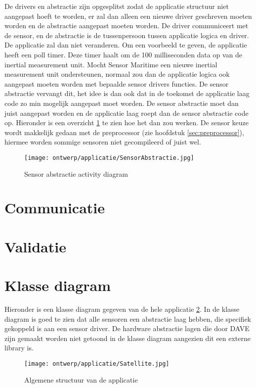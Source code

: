 \noindent De drivers en abstractie zijn opgesplitst zodat de applicatie structuur niet aangepast hoeft te worden, er zal dan alleen een nieuwe driver geschreven moeten worden en de abstractie aangepast moeten worden. De driver communiceert met de sensor, en de abstractie is de tussenpersoon tussen applicatie logica en driver. De applicatie zal dan niet veranderen. Om een voorbeeld te geven, de applicatie heeft een poll timer. Deze timer haalt om de 100 milliseconden data op van de inertial measurement unit. Mocht Sensor Maritime een nieuwe inertial measurement unit ondersteunen, normaal zou dan de applicatie logica ook aangepast moeten worden met bepaalde sensor drivers functies. De sensor abstractie vervangt dit, het idee is dan ook dat in de toekomst de applicatie laag code zo min mogelijk aangepast moet worden. De sensor abstractie moet dan juist aangepast worden en de applicatie laag roept dan de sensor abstractie code op. Hieronder is een overzicht \ref{fig:SensorAbstractie} te zien hoe het dan zou werken. De sensor keuze wordt makkelijk gedaan met de preprocessor (zie hoofdstuk \ref{sec:preprocessor}), hiermee worden sommige sensoren niet gecompileerd of juist wel.
\begin{figure}[h!]
	\centering
	\label{fig:SensorAbstractie}

	\texttt{[image: ontwerp/applicatie/SensorAbstractie.jpg]}
	\caption{Sensor abstractie activity diagram}
\end{figure}
	
	
\newpage
\section{Communicatie}

\newpage

\newpage
\section{Validatie}


\newpage
\section{Klasse diagram}
Hieronder is een klasse diagram gegeven van de hele applicatie \ref{fig:klassediagram}. In de klasse diagram is goed te zien dat alle sensoren een abstractie laag hebben, die specifiek gekoppeld is aan een sensor  driver. De hardware abstractie lagen die door DAVE zijn gemaakt worden niet getoond in de klasse diagram aangezien dit een externe library is.
\begin{figure}[h!]
	\centering
	\label{fig:klassediagram}

	\texttt{[image: ontwerp/applicatie/Satellite.jpg]}
	\caption{Algemene structuur van de applicatie}
\end{figure}
